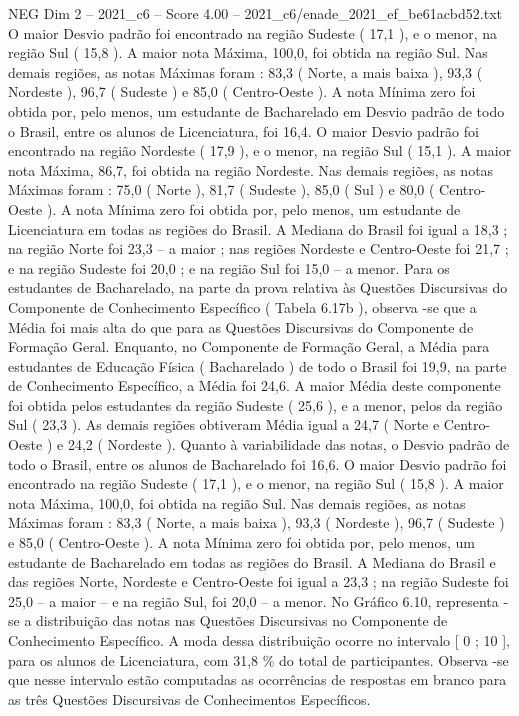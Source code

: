 \begin{textsample}{NEG Dim 2 – 2021\_c6 – Score 4.00 – 2021\_c6/enade\_2021\_ef\_be61acbd52.txt}
O maior Desvio padrão foi encontrado na região Sudeste ( 17,1 ), e o menor, na região Sul ( 15,8 ).
A maior nota Máxima, 100,0, foi obtida na região Sul.
Nas demais regiões, as notas Máximas foram : 83,3 ( Norte, a mais baixa ), 93,3 ( Nordeste ), 96,7 ( Sudeste ) e 85,0 ( Centro-Oeste ).
A nota Mínima zero foi obtida por, pelo menos, um estudante de Bacharelado em Desvio padrão de todo o Brasil, entre os alunos de Licenciatura, foi 16,4.
O maior Desvio padrão foi encontrado na região Nordeste ( 17,9 ), e o menor, na região Sul ( 15,1 ).
A maior nota Máxima, 86,7, foi obtida na região Nordeste.
Nas demais regiões, as notas Máximas foram : 75,0 ( Norte ), 81,7 ( Sudeste ), 85,0 ( Sul ) e 80,0 ( Centro-Oeste ).
A nota Mínima zero foi obtida por, pelo menos, um estudante de Licenciatura em todas as regiões do Brasil.
A Mediana do Brasil foi igual a 18,3 ; na região Norte foi 23,3 – a maior ; nas regiões Nordeste e Centro-Oeste foi 21,7 ; e na região Sudeste foi 20,0 ; e na região Sul foi 15,0 – a menor.
Para os estudantes de Bacharelado, na parte da prova relativa às Questões Discursivas do Componente de Conhecimento Específico ( Tabela 6.17b ), observa -se que a Média foi mais alta do que para as Questões Discursivas do Componente de Formação Geral.
Enquanto, no Componente de Formação Geral, a Média para estudantes de Educação Física ( Bacharelado ) de todo o Brasil foi 19,9, na parte de Conhecimento Específico, a Média foi 24,6.
A maior Média deste componente foi obtida pelos estudantes da região Sudeste ( 25,6 ), e a menor, pelos da região Sul ( 23,3 ).
As demais regiões obtiveram Média igual a 24,7 ( Norte e Centro-Oeste ) e 24,2 ( Nordeste ).
Quanto à variabilidade das notas, o Desvio padrão de todo o Brasil, entre os alunos de Bacharelado foi 16,6.
O maior Desvio padrão foi encontrado na região Sudeste ( 17,1 ), e o menor, na região Sul ( 15,8 ).
A maior nota Máxima, 100,0, foi obtida na região Sul.
Nas demais regiões, as notas Máximas foram : 83,3 ( Norte, a mais baixa ), 93,3 ( Nordeste ), 96,7 ( Sudeste ) e 85,0 ( Centro-Oeste ).
A nota Mínima zero foi obtida por, pelo menos, um estudante de Bacharelado em todas as regiões do Brasil.
A Mediana do Brasil e das regiões Norte, Nordeste e Centro-Oeste foi igual a 23,3 ; na região Sudeste foi 25,0 – a maior – e na região Sul, foi 20,0 – a menor.
No Gráfico 6.10, representa -se a distribuição das notas nas Questões Discursivas no Componente de Conhecimento Específico.
A moda dessa distribuição ocorre no intervalo [ 0 ; 10 ], para os alunos de Licenciatura, com 31,8 \% do total de participantes.
Observa -se que nesse intervalo estão computadas as ocorrências de respostas em branco para as três Questões Discursivas de Conhecimentos Específicos.

\end{textsample}

